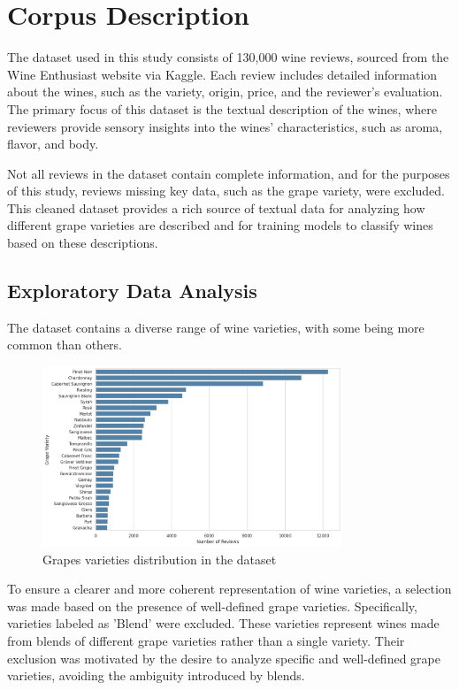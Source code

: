 \section{Corpus Description} 
The dataset used in this study consists of 130,000 wine 
reviews, sourced from the Wine Enthusiast website 
via Kaggle. Each review includes detailed information 
about the wines, such as the variety, origin, price, 
and the reviewer's evaluation. The primary focus of 
this dataset is the textual description of the wines, 
where reviewers provide sensory insights into the 
wines’ characteristics, such as aroma, flavor, and body.

Not all reviews in the dataset contain complete 
information, and for the purposes of this study, 
reviews missing key data, such as the grape variety, 
were excluded. This cleaned dataset provides a rich 
source of textual data for analyzing how different 
grape varieties are described and for training models 
to classify wines based on these descriptions.

\subsection{Exploratory Data Analysis}
The dataset contains a diverse range of wine varieties, 
with some being more common than others.
\begin{figure}
    \centering
    \includegraphics[width=0.8\textwidth]{images/bar_plot_variety_reviews_distribution.png}
    \caption{Grapes varieties distribution in the dataset}
    \label{fig:grape_variety_distribution}
\end{figure}

To ensure a clearer and more coherent representation 
of wine varieties, a selection was made based on the 
presence of well-defined grape varieties. 
Specifically, varieties labeled as 'Blend' were 
excluded. These varieties represent wines made from 
blends of different grape varieties rather than a 
single variety. Their exclusion was motivated by the 
desire to analyze specific and well-defined grape 
varieties, avoiding the ambiguity introduced by blends.

